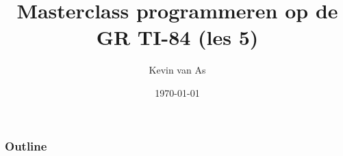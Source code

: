 \documentclass{beamer}
\title{Masterclass programmeren op de GR TI-84 (les 5)}
\author{Kevin van As}
\date{\today}
\begin{document}
\begin{frame}
\titlepage
\end{frame}



\begin{frame}
\frametitle{Outline}
\tableofcontents
\end{frame}






% 
%
% 
% 
%
%
%
\end{document}
